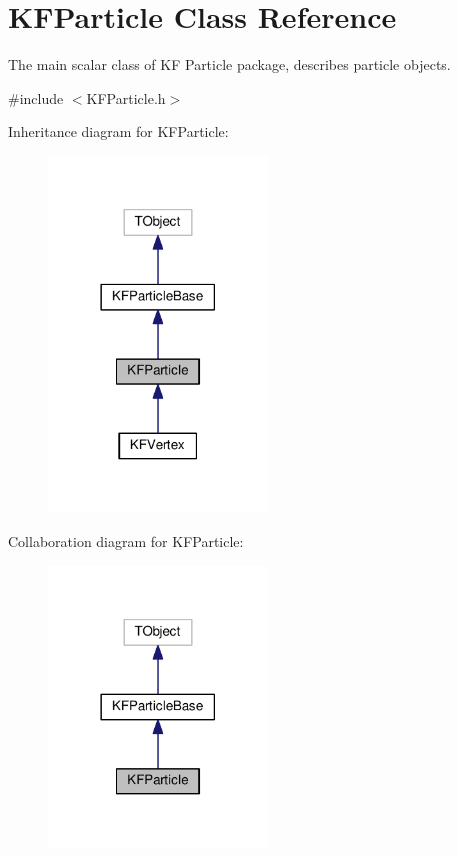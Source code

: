 \hypertarget{classKFParticle}{}\section{K\+F\+Particle Class Reference}
\label{classKFParticle}


The main scalar class of KF Particle package, describes particle objects.  




{\ttfamily \#include $<$K\+F\+Particle.\+h$>$}



Inheritance diagram for K\+F\+Particle\+:
\nopagebreak
\begin{figure}[H]
\begin{center}
\leavevmode
\includegraphics[width=165pt]{classKFParticle__inherit__graph}
\end{center}
\end{figure}


Collaboration diagram for K\+F\+Particle\+:
\nopagebreak
\begin{figure}[H]
\begin{center}
\leavevmode
\includegraphics[width=165pt]{classKFParticle__coll__graph}
\end{center}
\end{figure}
